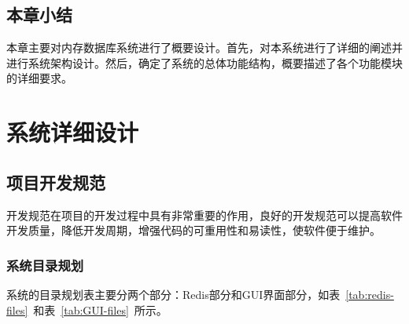\documentclass{zjutthesis}
\begin{document}
\section{本章小结}
本章主要对内存数据库系统进行了概要设计。首先，对本系统进行了详细的阐述并进行系统架构设计。然后，确定了系统的总体功能结构，概要描述了各个功能模块的详细要求。


\chapter{系统详细设计}
\section{项目开发规范}
开发规范在项目的开发过程中具有非常重要的作用，良好的开发规范可以提高软件开发质量，降低开发周期，增强代码的可重用性和易读性，使软件便于维护。

\subsection{系统目录规划}
系统的目录规划表主要分两个部分：Redis部分和GUI界面部分，如表~\ref{tab:redis-files}~和表~\ref{tab:GUI-files}~所示。

\begin{table}[H]
\centering
\caption{系统目录规划表（Redis部分）}\label{tab:redis-files}
\vspace{\baselineskip}
\end{table}

\begin{table}[H]
\centering
\caption{系统目录规划表（GUI部分）}\label{tab:GUI-files}
\vspace{\baselineskip}
\end{table}
\end{document}
